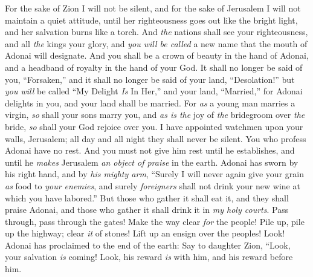 \begin{biblechapter} %
 For the sake of Zion I will not be silent, 
and for the sake of Jerusalem I will not maintain a quiet attitude, 
until her righteousness goes out like the bright light, 
and her salvation burns like a torch.
\verse And \textit{the} nations shall see your righteousness, 
and all \textit{the} kings your glory, 
and \textit{you will be called} a new name 
that the mouth of Adonai will designate.
\verse And you shall be a crown of beauty in the hand of Adonai, 
and a headband of royalty in the hand of your God.
\verse It shall no longer be said of you, “Forsaken,” 
and it shall no longer be said of your land, “Desolation!” 
but \textit{you will} be called “My Delight \textit{Is} In Her,” 
and your land, “Married,” 
for Adonai delights in you, 
and your land shall be married.
\verse For \textit{as} a young man marries a virgin, 
\textit{so} shall your sons marry you, 
and \textit{as is the} joy of \textit{the} bridegroom over \textit{the} bride, 
\textit{so} shall your God rejoice over you.
\verse I have appointed watchmen upon your walls, Jerusalem; 
all day and all night they shall never be silent. 
You who profess Adonai have no rest.
\verse And you must not give him rest until he establishes, 
and until he \textit{makes} Jerusalem \textit{an object of praise} in the earth.
\verse Adonai has sworn by his right hand, 
and by \textit{his mighty arm}, 
“Surely I will never again give your grain \textit{as} food to \textit{your enemies}, 
and surely \textit{foreigners} shall not drink your new wine at which you have labored.”
\verse But those who gather it shall eat it, and they shall praise Adonai, 
and those who gather it shall drink it in \textit{my holy courts}.
\verse Pass through, pass through the gates! 
Make the way clear \textit{for} the people! 
Pile up, pile up the highway; clear \textit{it} of stones! 
Lift up an ensign over the peoples!
\verse Look! Adonai has proclaimed to the end of the earth:
\verse Say to daughter Zion, “Look, your salvation \textit{is} coming! 
Look, his reward \textit{is} with him, 
and his reward before him.
\end{biblechapter}


